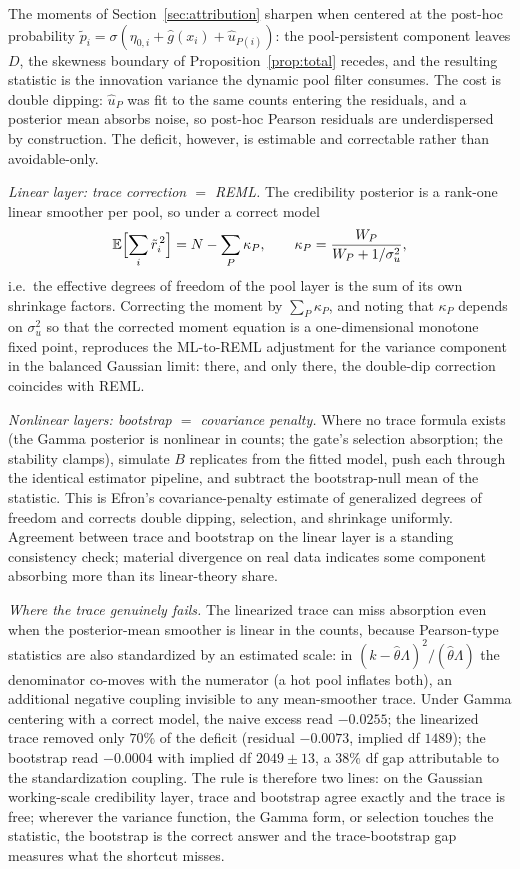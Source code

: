 \documentclass[11pt]{article}
\newcommand{\E}{\mathbb{E}}
\begin{document}
The moments of Section~\ref{sec:attribution} sharpen when centered at the post-hoc
probability $\tilde p_i=\sigma(\eta_{0,i}+\hat g(x_i)+\hat u_{P(i)})$: the
pool-persistent component leaves $D$, the skewness boundary of
Proposition~\ref{prop:total} recedes, and the resulting statistic is the innovation
variance the dynamic pool filter consumes. The cost is double dipping: $\hat u_P$ was
fit to the same counts entering the residuals, and a posterior mean absorbs noise, so
post-hoc Pearson residuals are underdispersed by construction. The deficit, however,
is estimable and correctable rather than avoidable-only.

\emph{Linear layer: trace correction $=$ REML.} The credibility posterior is a
rank-one linear smoother per pool, so under a correct model
\[
\E\Bigl[\sum_i \tilde r_i^{\,2}\Bigr]=N-\sum_P\kappa_P,
\qquad
\kappa_P=\frac{W_P}{W_P+1/\sigma_u^2},
\]
i.e.\ the effective degrees of freedom of the pool layer is the sum of its own
shrinkage factors. Correcting the moment by $\sum_P\kappa_P$, and noting that
$\kappa_P$ depends on $\sigma_u^2$ so that the corrected moment equation is a
one-dimensional monotone fixed point, reproduces the ML-to-REML adjustment
for the variance component in the balanced Gaussian limit: there, and only
there, the double-dip correction coincides with REML.

\emph{Nonlinear layers: bootstrap $=$ covariance penalty.} Where no trace formula
exists (the Gamma posterior is nonlinear in counts; the gate's selection absorption;
the stability clamps), simulate $B$ replicates from the fitted model, push each
through the identical estimator pipeline, and subtract the bootstrap-null mean of the
statistic. This is Efron's covariance-penalty estimate of generalized degrees of
freedom \cite{efron2004pred,ye1998} and corrects double dipping, selection, and
shrinkage uniformly. Agreement between trace and bootstrap on the linear layer is a
standing consistency check; material divergence on real data indicates some component
absorbing more than its linear-theory share.

\emph{Where the trace genuinely fails.} The linearized trace can miss absorption even
when the posterior-mean smoother is linear in the counts, because Pearson-type
statistics are also standardized by an estimated scale: in $(k-\hat\theta\Lambda)^2/
(\hat\theta\Lambda)$ the denominator co-moves with the numerator (a hot pool inflates
both), an additional negative coupling invisible to any mean-smoother trace. Under
Gamma centering with a correct model, the naive excess read $-0.0255$; the linearized
trace removed only $70\%$ of the deficit (residual $-0.0073$, implied df $1489$);
the bootstrap read $-0.0004$ with implied df $2049\pm13$, a $38\%$ df gap
attributable to the standardization coupling. The rule is therefore two lines: on the
Gaussian working-scale credibility layer, trace and bootstrap agree exactly and the
trace is free; wherever the variance function, the Gamma form, or selection touches
the statistic, the bootstrap is the correct answer and the trace-bootstrap gap
measures what the shortcut misses.
\end{document}
